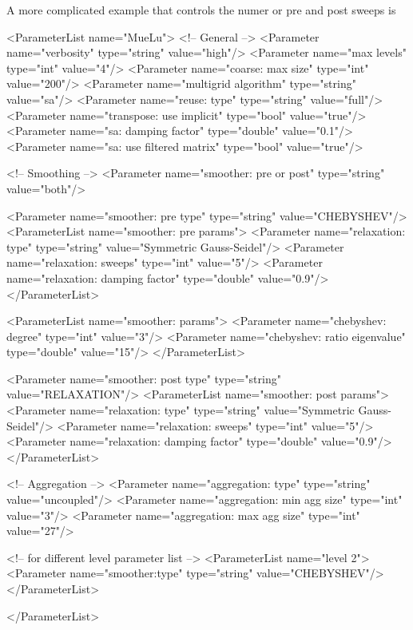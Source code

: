 A more complicated example that controls the numer or pre and post sweeps is
\begin{python}[caption=complicatedbob.xml,label=complicatedbob]
<ParameterList name="MueLu">
  <!--    General    -->
  <Parameter name="verbosity"               type="string"    value="high"/> 
  <Parameter name="max levels"              type="int"       value="4"/>
  <Parameter name="coarse: max size"        type="int"       value="200"/>
  <Parameter name="multigrid algorithm"     type="string"    value="sa"/>
  <Parameter name="reuse: type"             type="string"    value="full"/>
  <Parameter name="transpose: use implicit" type="bool"      value="true"/>
  <Parameter name="sa: damping factor"      type="double"    value="0.1"/> 
  <Parameter name="sa: use filtered matrix" type="bool"      value="true"/>

  <!-- Smoothing -->
  <Parameter name="smoother: pre or post"        type="string"  value="both"/>

  <Parameter name="smoother: pre type"           type="string"  value="CHEBYSHEV"/>
  <ParameterList name="smoother: pre params">
    <Parameter name="relaxation: type"           type="string"  value="Symmetric Gauss-Seidel"/>
    <Parameter name="relaxation: sweeps"         type="int"     value="5"/>
    <Parameter name="relaxation: damping factor" type="double"  value="0.9"/>
  </ParameterList>
  
  <ParameterList name="smoother: params">
    <Parameter name="chebyshev: degree"           type="int"     value="3"/>
    <Parameter name="chebyshev: ratio eigenvalue" type="double"  value="15"/>
  </ParameterList>

  <Parameter name="smoother: post type"           type="string"  value="RELAXATION"/>
  <ParameterList name="smoother: post params">
    <Parameter name="relaxation: type"           type="string"  value="Symmetric Gauss-Seidel"/>
    <Parameter name="relaxation: sweeps"         type="int"     value="5"/>
    <Parameter name="relaxation: damping factor" type="double"  value="0.9"/>
  </ParameterList>

  <!-- Aggregation -->
  <Parameter name="aggregation: type"           type="string"  value="uncoupled"/>
  <Parameter name="aggregation: min agg size"   type="int"     value="3"/>
  <Parameter name="aggregation: max agg size"   type="int"     value="27"/>

  <!--  for different level parameter list -->
  <ParameterList name="level 2">
    <Parameter name="smoother:type" type="string" value="CHEBYSHEV"/>
  </ParameterList>

</ParameterList>
\end{python}

